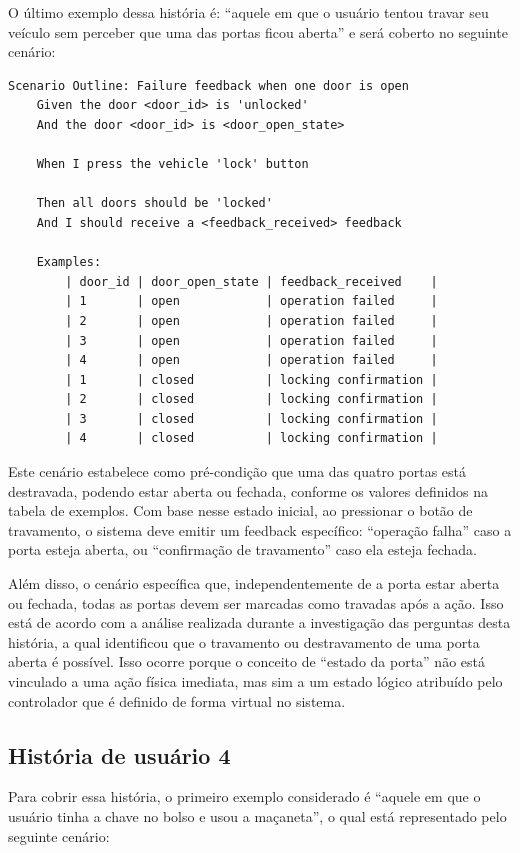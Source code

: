 O último exemplo dessa história é: ``aquele em que o usuário tentou travar seu veículo sem perceber que uma das portas ficou aberta'' e será coberto no seguinte cenário:

\begin{verbatim}
Scenario Outline: Failure feedback when one door is open
    Given the door <door_id> is 'unlocked'
    And the door <door_id> is <door_open_state>

    When I press the vehicle 'lock' button

    Then all doors should be 'locked'
    And I should receive a <feedback_received> feedback

    Examples:
        | door_id | door_open_state | feedback_received    |
        | 1       | open            | operation failed     |
        | 2       | open            | operation failed     |
        | 3       | open            | operation failed     |
        | 4       | open            | operation failed     |
        | 1       | closed          | locking confirmation |
        | 2       | closed          | locking confirmation |
        | 3       | closed          | locking confirmation |
        | 4       | closed          | locking confirmation |
\end{verbatim}

Este cenário estabelece como pré-condição que uma das quatro portas está destravada, podendo estar aberta ou fechada, conforme os valores definidos na tabela de exemplos. 
Com base nesse estado inicial, ao pressionar o botão de travamento, o sistema deve emitir um feedback específico: ``operação falha'' caso a porta esteja aberta, ou 
``confirmação de travamento'' caso ela esteja fechada.

Além disso, o cenário específica que, independentemente de a porta estar aberta ou fechada, todas as portas devem ser marcadas como travadas após a ação. Isso está 
de acordo com a análise realizada durante a investigação das perguntas desta história, a qual identificou que o travamento ou destravamento de uma porta aberta é possível. 
Isso ocorre porque o conceito de ``estado da porta'' não está vinculado a uma ação física imediata, mas sim a um estado lógico atribuído pelo controlador que é definido 
de forma virtual no sistema.


\subsection{História de usuário 4}

Para cobrir essa história, o primeiro exemplo considerado é ``aquele em que o usuário tinha a chave no bolso e usou a maçaneta'', o qual está representado pelo seguinte cenário:


